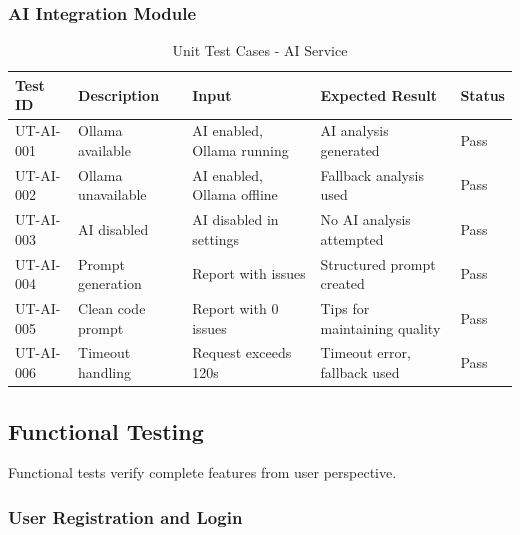 \documentclass[12pt,a4paper]{article}
\begin{document}
    \subsubsection{AI Integration Module}

    \begin{table}[H]
        \caption{Unit Test Cases - AI Service}
        \begin{tabular}{|p{2cm}|p{4cm}|p{3cm}|p{3cm}|p{1.5cm}|}
            \hline
            \textbf{Test ID} & \textbf{Description} & \textbf{Input} & \textbf{Expected Result} & \textbf{Status} \\
            \hline
            UT-AI-001 & Ollama available & AI enabled, Ollama running & AI analysis generated & Pass \\
            \hline
            UT-AI-002 & Ollama unavailable & AI enabled, Ollama offline & Fallback analysis used & Pass \\
            \hline
            UT-AI-003 & AI disabled & AI disabled in settings & No AI analysis attempted & Pass \\
            \hline
            UT-AI-004 & Prompt generation & Report with issues & Structured prompt created & Pass \\
            \hline
            UT-AI-005 & Clean code prompt & Report with 0 issues & Tips for maintaining quality & Pass \\
            \hline
            UT-AI-006 & Timeout handling & Request exceeds 120s & Timeout error, fallback used & Pass \\
            \hline
        \end{tabular}
    \end{table}

    \subsection{Functional Testing}

    Functional tests verify complete features from user perspective.

    \subsubsection{User Registration and Login}
\end{document}
